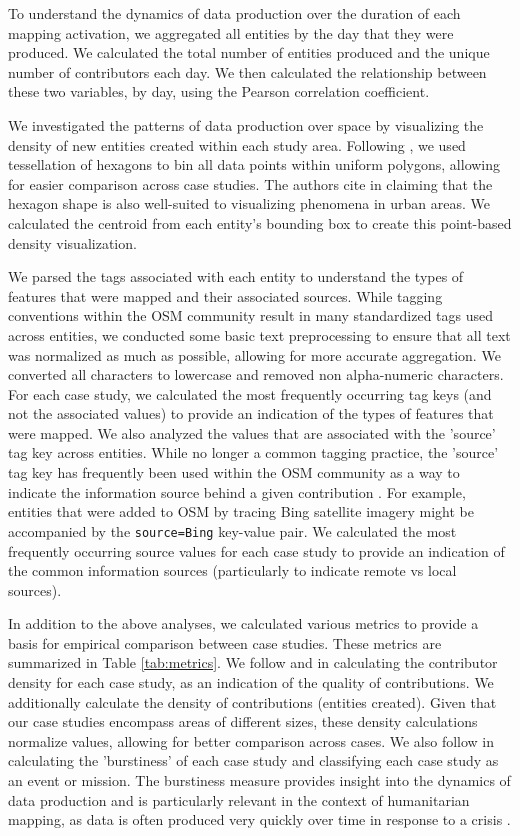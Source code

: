 To understand the dynamics of data production over the duration of each mapping activation, we aggregated all entities by the day that they were produced. We calculated the total number of entities produced and the unique number of contributors each day. We then calculated the relationship between these two variables, by day, using the Pearson correlation coefficient. 

We investigated the patterns of data production over space by visualizing the density of new entities created within each study area. Following \textcite{grochenig_estimating_2014}, we used tessellation of hexagons to bin all data points within uniform polygons, allowing for easier comparison across case studies. The authors cite \textcite{hagenauer_mining_2012} in claiming that the hexagon shape is also well-suited to visualizing phenomena in urban areas. We calculated the centroid from each entity's bounding box to create this point-based density visualization. 

We parsed the tags associated with each entity to understand the types of features that were mapped and their associated sources. While tagging conventions within the OSM community result in many standardized tags used across entities, we conducted some basic text preprocessing to ensure that all text was normalized as much as possible, allowing for more accurate aggregation. We converted all characters to lowercase and removed non alpha-numeric characters. For each case study, we calculated the most frequently occurring tag keys (and not the associated values) to provide an indication of the types of features that were mapped. We also analyzed the values that are associated with the 'source' tag key across entities. While no longer a common tagging practice, the 'source' tag key has frequently been used within the OSM community as a way to indicate the information source behind a given contribution \parencite{noauthor_keysource_nodate}. For example, entities that were added to OSM by tracing Bing satellite imagery might be accompanied by the \texttt{source=Bing} key-value pair. We calculated the most frequently occurring source values for each case study to provide an indication of the common information sources (particularly to indicate remote vs local sources). 

In addition to the above analyses, we calculated various metrics to provide a basis for empirical comparison between case studies. These metrics are summarized in Table \ref{tab:metrics}. We follow \textcite{anderson_crowd_2018} and \textcite{haklay_how_2010} in calculating the contributor density for each case study, as an indication of the quality of contributions. We additionally calculate the density of contributions (entities created). Given that our case studies encompass areas of different sizes, these density calculations normalize values, allowing for better comparison across cases. We also follow \textcite{dittus_mass_2017} in calculating the 'burstiness' of each case study and classifying each case study as an event or mission. The burstiness measure provides insight into the dynamics of data production and is particularly relevant in the context of humanitarian mapping, as data is often produced very quickly over time in response to a crisis \parencite{dittus_mass_2017}. 

